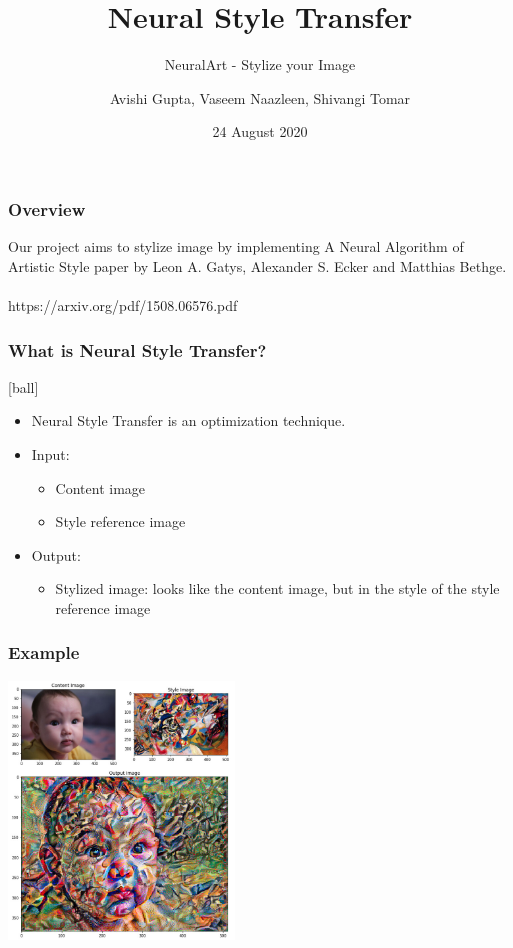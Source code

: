 \documentclass[14pt]{beamer}
\title[NST]{Neural Style Transfer}
\subtitle{NeuralArt - Stylize your Image}
\author[Team - 38]{Avishi Gupta, Vaseem Naazleen, Shivangi Tomar}
\date{24 August 2020}
\begin{document}
\begin{frame}
   \titlepage
\end{frame}

\begin{frame}
		\frametitle{Overview}
		Our project aims to stylize image by implementing A Neural Algorithm of Artistic Style paper by Leon A. Gatys, Alexander S. Ecker and Matthias Bethge. \\~\\

		https://arxiv.org/pdf/1508.06576.pdf
\end{frame}

\begin{frame}
		\frametitle{What is Neural Style Transfer?}
		\begin{itemize}
            \item Neural Style Transfer is an optimization technique.
           \item Input:
		\begin{itemize}
		     \item Content image
		     \item Style reference image
		\end{itemize}
             \item Output:
		\begin{itemize}
             \item Stylized image: looks like the content image, but  in the style of the style
        reference image
        \end{itemize}
        \end{itemize}
\end{frame}

\begin{frame}
    \frametitle{Example}
    \begin{center}
        \includegraphics[width=60mm]{baby.jpeg}
    \end{center}
\end{frame}
\end{document}
